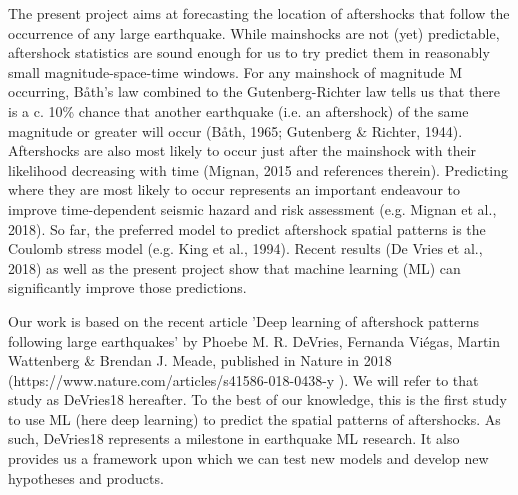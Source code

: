 \documentclass[journal,transmag]{IEEEtran}
\begin{document}
\IEEEPARstart
The present project aims at forecasting the location of aftershocks that follow the occurrence of any large earthquake. While mainshocks are not (yet) predictable, aftershock statistics are sound enough for us to try predict them in reasonably small magnitude-space-time windows. For any mainshock of magnitude M occurring, Båth's law combined to the Gutenberg-Richter law tells us that there is a c. 10\% chance that another earthquake (i.e. an aftershock) of the same magnitude or greater will occur (Båth, 1965; Gutenberg \& Richter, 1944). Aftershocks are also most likely to occur just after the mainshock with their likelihood decreasing with time (Mignan, 2015 and references therein). Predicting where they are most likely to occur represents an important endeavour to improve time-dependent seismic hazard and risk assessment (e.g. Mignan et al., 2018). So far, the preferred model to predict aftershock spatial patterns is the Coulomb stress model (e.g. King et al., 1994). Recent results (De Vries et al., 2018) as well as the present project show that machine learning (ML) can significantly improve those predictions.

\par Our work is based on the recent article 'Deep learning of aftershock patterns following large earthquakes' by Phoebe M. R. DeVries, Fernanda Viégas, Martin Wattenberg \& Brendan J. Meade, published in Nature in 2018 (https://www.nature.com/articles/s41586-018-0438-y ). We will refer to that study as DeVries18 hereafter. To the best of our knowledge, this is the first study to use ML (here deep learning) to predict the spatial patterns of aftershocks. As such, DeVries18 represents a milestone in earthquake ML research. It also provides us a framework upon which we can test new models and develop new hypotheses and products.
\end{document}
